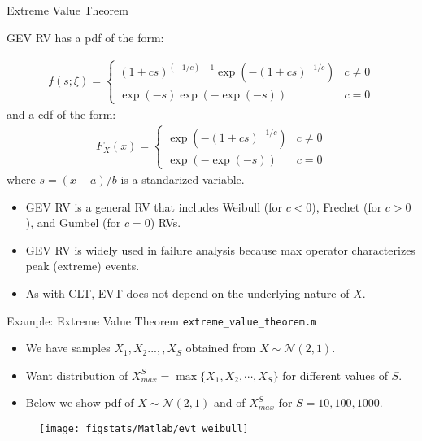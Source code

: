\documentclass[handout,9pt]{beamer}
\begin{document}
%
\begin{frame}{Extreme Value Theorem}

GEV RV has a pdf of the form:
\begin{block}{}
\begin{align*}
f(s;\xi) = \begin{cases}(1+c s)^{(-1/c)-1} \exp(-(1+c s)^{-1/c}) & c\neq0 \\
\exp(-s) \exp(-\exp(-s)) & c = 0\end{cases}
\end{align*}
and a cdf of the form:
\begin{align*}
F_X(x)= \begin{cases}\exp(-(1+c s)^{-1/c}) & c\neq0 \\ \exp(-\exp(-s)) & c = 0\end{cases}
\end{align*}
where $s=(x-a)/b$ is a standarized variable. 
\end{block}
\begin{itemize}
\setlength{\itemsep}{10pt}
\item GEV RV is a general RV that includes Weibull (for $c<0$), Frechet (for $c>0$), and Gumbel (for $c=0$) RVs. 

\item GEV RV is widely used in failure analysis because max operator characterizes peak (extreme) events. 

\item As with CLT,  EVT does not depend on the underlying nature of $X$. 

\end{itemize}


\end{frame}

%
\begin{frame}{Example: Extreme Value Theorem \footnotesize{\texttt{extreme\_value\_theorem.m}}}

\begin{itemize}
\setlength{\itemsep}{5pt}
\item We have samples $X_1,X_2...,,X_S$ obtained from $X\sim \mathcal{N}(2,1)$.
\item Want distribution of $X_{max}^S=\max\{X_1,X_2,\cdots, X_S\}$ for different values of $S$.
\item Below we show pdf of $X\sim \mathcal{N}(2,1)$ and of $X_{max}^S$ for $S=10,100,1000$.
\end{itemize}
\begin{figure}[!htb]
    \centering
	\texttt{[image: figstats/Matlab/evt\_weibull]}
\end{figure}

\end{frame}
\end{document}

